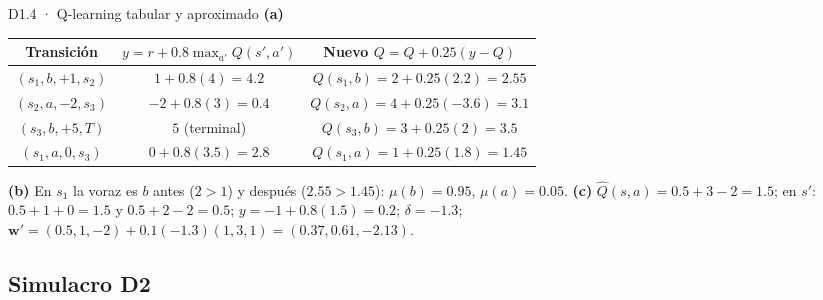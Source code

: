\begin{solucion}{D1.4 · Q-learning tabular y aproximado}
\textbf{(a)}
\begin{center}\small
\begin{tabular}{c|c|c}
Transición & $y=r+0.8\max_{a'}Q(s',a')$ & Nuevo $Q=Q+0.25(y-Q)$\\\hline
$(s_1,b,+1,s_2)$ & $1+0.8(4)=4.2$ & $Q(s_1,b)=2+0.25(2.2)=\mathbf{2.55}$\\
$(s_2,a,-2,s_3)$ & $-2+0.8(3)=0.4$ & $Q(s_2,a)=4+0.25(-3.6)=\mathbf{3.1}$\\
$(s_3,b,+5,T)$ & $5$ (terminal) & $Q(s_3,b)=3+0.25(2)=\mathbf{3.5}$\\
$(s_1,a,0,s_3)$ & $0+0.8(3.5)=2.8$ & $Q(s_1,a)=1+0.25(1.8)=\mathbf{1.45}$
\end{tabular}
\end{center}
\textbf{(b)} En $s_1$ la voraz es $b$ antes ($2>1$) y después ($2.55>1.45$): $\mu(b)=0.95$, $\mu(a)=0.05$.
\textbf{(c)} $\hat Q(s,a)=0.5+3-2=1.5$; en $s'$: $0.5+1+0=1.5$ y $0.5+2-2=0.5$; $y=-1+0.8(1.5)=0.2$; $\delta=-1.3$;
$\mathbf w'=(0.5,1,-2)+0.1(-1.3)(1,3,1)=(\mathbf{0.37},\mathbf{0.61},\mathbf{-2.13})$.
\end{solucion}

\subsection*{Simulacro D2}

